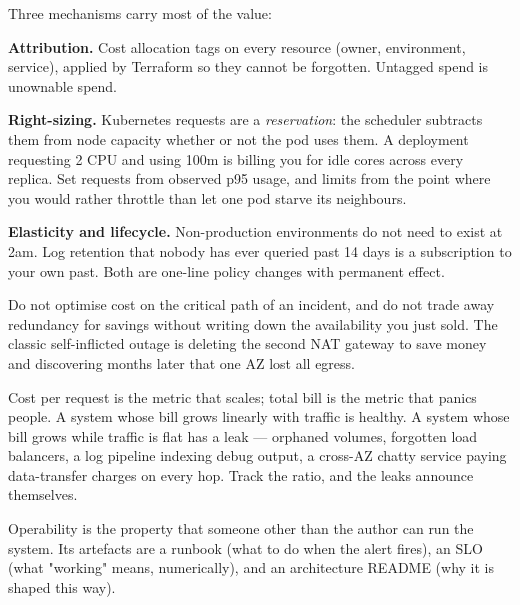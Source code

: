  Three mechanisms carry most of the value:

\begin{wbitem}
  \item \textbf{Attribution.} Cost allocation tags on every resource (owner, environment, service), applied by Terraform  so they cannot be forgotten. Untagged spend is unownable spend.
  \item \textbf{Right-sizing.} Kubernetes requests are a \emph{reservation}: the scheduler subtracts them from node capacity whether or not the pod uses them. A deployment requesting 2 CPU and using 100m is billing you for idle cores across every replica. Set requests from observed p95 usage, and limits from the point where you would rather throttle than let one pod starve its neighbours.
  \item \textbf{Elasticity and lifecycle.} Non-production environments do not need to exist at 2am. Log retention that nobody has ever queried past 14 days is a subscription to your own past. Both are one-line policy changes with permanent effect.
\end{wbitem}

 Do not optimise cost on the critical path of an incident, and do not trade away redundancy for savings without writing down the availability you just sold. The classic self-inflicted outage is deleting the second NAT gateway to save money and discovering months later that one AZ lost all egress.

\begin{scalenote}
Cost per request is the metric that scales; total bill is the metric that panics people. A system whose bill grows linearly with traffic is healthy. A system whose bill grows while traffic is flat has a leak --- orphaned volumes, forgotten load balancers, a log pipeline indexing debug output, a cross-AZ chatty service paying data-transfer charges on every hop. Track the ratio, and the leaks announce themselves.
\end{scalenote}


 Operability is the property that someone other than the author can run the system. Its artefacts are a runbook (what to do when the alert fires), an SLO (what "working" means, numerically), and an architecture README (why it is shaped this way).

